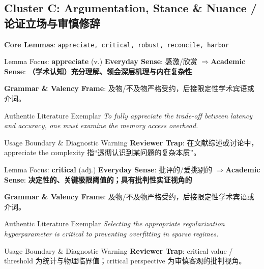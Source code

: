 \subsection{Cluster C: Argumentation, Stance \& Nuance / 论证立场与审慎修辞}
\noindent\textbf{\color{AcadSlate}Core Lemmas}: \texttt{appreciate, critical, robust, reconcile, harbor}\par\vspace{4pt}
\begin{ConceptBox}{Lemma Focus: \textbf{appreciate} (v.)}
\textbf{Everyday Sense}: 感激/欣赏 \quad$\Longrightarrow$\quad \textbf{Academic Sense}: \textbf{（学术认知）充分理解、领会深层机理与内在复杂性}\par\vspace{3pt}
\textbf{Grammar \& Valency Frame}: 及物/不及物严格受约，后接限定性学术宾语或介词。\par
\end{ConceptBox}
\begin{ExampleBox}{Authentic Literature Exemplar}
\textit{To fully appreciate the trade-off between latency and accuracy, one must examine the memory access overhead.}
\end{ExampleBox}
\begin{TipBox}{Usage Boundary \& Diagnostic Warning}
\textbf{Reviewer Trap}: 在文献综述或讨论中，appreciate the complexity 指“透彻认识到某问题的复杂本质”。
\end{TipBox}
\vspace{6pt}
\begin{ConceptBox}{Lemma Focus: \textbf{critical} (adj.)}
\textbf{Everyday Sense}: 批评的/爱挑剔的 \quad$\Longrightarrow$\quad \textbf{Academic Sense}: \textbf{决定性的、关键极限阈值的；具有批判性实证视角的}\par\vspace{3pt}
\textbf{Grammar \& Valency Frame}: 及物/不及物严格受约，后接限定性学术宾语或介词。\par
\end{ConceptBox}
\begin{ExampleBox}{Authentic Literature Exemplar}
\textit{Selecting the appropriate regularization hyperparameter is critical to preventing overfitting in sparse regimes.}
\end{ExampleBox}
\begin{TipBox}{Usage Boundary \& Diagnostic Warning}
\textbf{Reviewer Trap}: critical value / threshold 为统计与物理临界值；critical perspective 为审慎客观的批判视角。
\end{TipBox}
\vspace{6pt}
